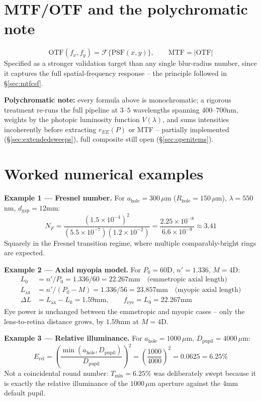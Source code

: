 \documentclass[11pt]{report}
\newcommand{\ahole}{a_{\text{hole}}}
\newcommand{\dgap}{d_{\text{gap}}}
\newcommand{\Dpupil}{D_{\text{pupil}}}
\newcommand{\Erel}{E_{\text{rel}}}
\begin{document}
\section{MTF/OTF and the polychromatic note}
\begin{equation}
\text{OTF}(f_x,f_y) = \mathcal{F}\{\text{PSF}(x,y)\}, \qquad \text{MTF} = |\text{OTF}|
\label{eq:mtfotf}
\end{equation}
Specified as a stronger validation target than any single blur-radius number, since it captures the full spatial-frequency response -- the principle followed in \S\ref{sec:mtfcsf}.

\textbf{Polychromatic note:} every formula above is monochromatic; a rigorous treatment re-runs the full pipeline at $3$--$5$ wavelengths spanning $400$--$700$nm, weights by the photopic luminosity function $V(\lambda)$, and sums intensities incoherently before extracting $r_{EE}(P)$ or MTF -- partially implemented (\S\ref{sec:extendedsweeps}), full composite still open (\S\ref{sec:openitems}).

\section{Worked numerical examples}

\textbf{Example 1 --- Fresnel number.} For $\ahole=300\,\mu$m ($R_{\text{hole}}=150\,\mu$m), $\lambda=550$nm, $\dgap=12$mm:
\begin{equation}
N_F = \frac{(1.5\times10^{-4})^2}{(5.5\times10^{-7})(1.2\times10^{-2})} = \frac{2.25\times10^{-8}}{6.6\times10^{-9}} \approx 3.41
\end{equation}
Squarely in the Fresnel transition regime, where multiple comparably-bright rings are expected.

\textbf{Example 2 --- Axial myopia model.} For $P_0=60$D, $n'=1.336$, $M=4$D:
\begin{align}
L_0 &= n'/P_0 = 1.336/60 = 22.267\text{mm} \quad\text{(emmetropic axial length)}\\
L_{\text{ax}} &= n'/(P_0-M) = 1.336/56 = 23.857\text{mm} \quad\text{(myopic axial length)}\\
\Delta L &= L_{\text{ax}}-L_0 = 1.59\text{mm}, \qquad f_{\text{eye}} = L_0 = 22.267\text{mm}
\end{align}
Eye power is unchanged between the emmetropic and myopic cases -- only the lens-to-retina distance grows, by $1.59$mm at $M=4$D.

\textbf{Example 3 --- Relative illuminance.} For $\ahole=1000\,\mu$m, $\Dpupil=4000\,\mu$m:
\begin{equation}
\Erel = \left(\frac{\min(\ahole,\Dpupil)}{\Dpupil}\right)^2 = \left(\frac{1000}{4000}\right)^2 = 0.0625 = 6.25\%
\end{equation}
Not a coincidental round number: $T_{\min}=6.25\%$ was deliberately swept because it is exactly the relative illuminance of the $1000\,\mu$m aperture against the $4$mm default pupil.
\end{document}
